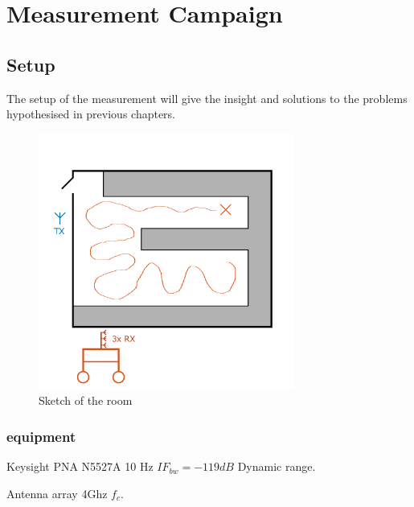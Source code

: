 \chapter{Measurement Campaign}
\section{Setup}
The setup of the measurement will give the insight and solutions to the problems hypothesised in previous chapters. 

\begin{figure}[H]
\centering
\includegraphics[width=0.75\textwidth]{figures/Gimp_figures/MeasSetup.png}
\caption{Sketch of the room}
\label{room sketch}
\end{figure}
\subsection{equipment}
\label{equip}
Keysight PNA N5527A 
10 Hz $IF_{bw} = -119dB$ Dynamic range.

Antenna array 4Ghz $f_c$.


